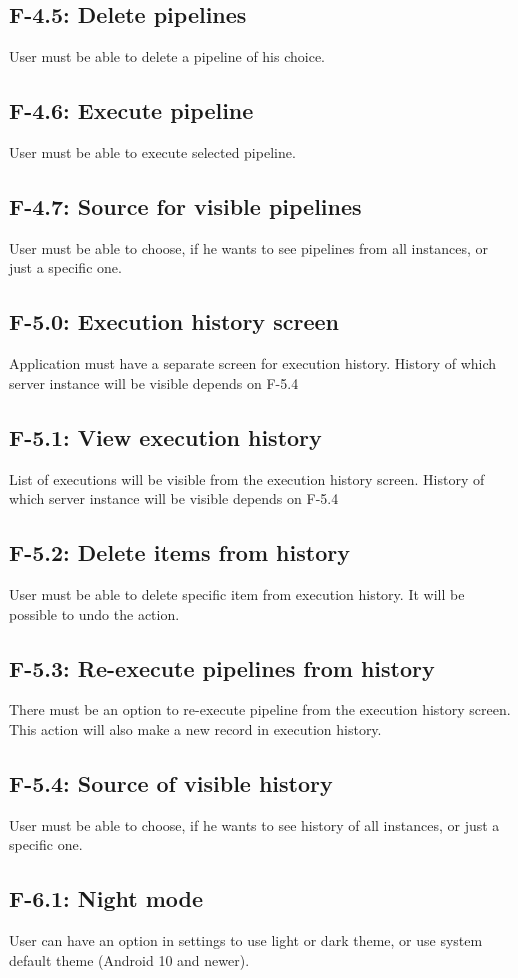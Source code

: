 \subsection*{F-4.5: Delete pipelines}
User must be able to delete a pipeline of his choice.
\subsection*{F-4.6: Execute pipeline}
User must be able to execute selected pipeline.
\subsection*{F-4.7: Source for visible pipelines}
User must be able to choose, if he wants to see pipelines from all instances, or just a specific one.
\subsection*{F-5.0: Execution history screen}
Application must have a separate screen for execution history. History of which server instance will be visible depends on F-5.4
\subsection*{F-5.1: View execution history}
List of executions will be visible from the execution history screen. History of which server instance will be visible depends on F-5.4
\subsection*{F-5.2: Delete items from history}
User must be able to delete specific item from execution history. It will be possible to undo the action.
\subsection*{F-5.3: Re-execute pipelines from history}
There must be an option to re-execute pipeline from the execution history screen. This action will also make a new record in execution history.
\subsection*{F-5.4: Source of visible history}
User must be able to choose, if he wants to see history of all instances, or just a specific one.
\subsection*{F-6.1: Night mode}
User can have an option in settings to use light or dark theme, or use system default theme (Android 10 and newer).











